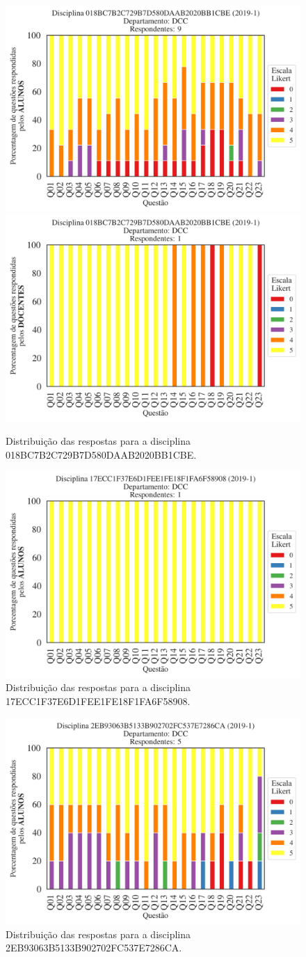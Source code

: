 \documentclass[a4paper,10pt]{article}
\begin{document}
\begin{figure}[h]
\centering
\includegraphics[width=0.485\linewidth]{analise_disciplina_departamento_DCC_ALUNO_TURMA_018BC7B2C729B7D580DAAB2020BB1CBE.png}
\includegraphics[width=0.485\linewidth]{analise_disciplina_departamento_DCC_DOCENTE_TURMA_018BC7B2C729B7D580DAAB2020BB1CBE.png}
\caption{\label{fig:analise_geral_departamento}                Distribuição das respostas para a disciplina 018BC7B2C729B7D580DAAB2020BB1CBE.}
\end{figure}
\begin{figure}[h]
\centering
\includegraphics[width=0.485\linewidth]{analise_disciplina_departamento_DCC_ALUNO_TURMA_17ECC1F37E6D1FEE1FE18F1FA6F58908.png}
\caption{\label{fig:analise_geral_departamento}                Distribuição das respostas para a disciplina 17ECC1F37E6D1FEE1FE18F1FA6F58908.}
\end{figure}
\begin{figure}[h]
\centering
\includegraphics[width=0.485\linewidth]{analise_disciplina_departamento_DCC_ALUNO_TURMA_2EB93063B5133B902702FC537E7286CA.png}
\caption{\label{fig:analise_geral_departamento}                Distribuição das respostas para a disciplina 2EB93063B5133B902702FC537E7286CA.}
\end{figure}
\end{document}
